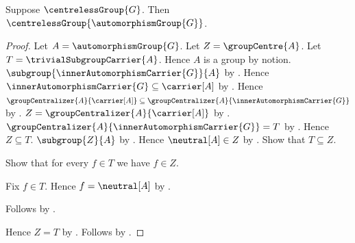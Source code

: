 \begin{theorem}\label{automorphism_group_centreless}
    Suppose $\centrelessGroup{G}$.
    Then $\centrelessGroup{\automorphismGroup{G}}$.
\end{theorem}
\begin{proof}
    Let $A=\automorphismGroup{G}$.
    Let $Z=\groupCentre{A}$.
    Let $T=\trivialSubgroupCarrier{A}$.
    Hence $A$ is a group by notion.
    $\subgroup{\innerAutomorphismCarrier{G}}{A}$ by
        .
    Hence $\innerAutomorphismCarrier{G}\subseteq\carrier[A]$ by
        .
    Hence
        $\groupCentralizer{A}{\carrier[A]}\subseteq
            \groupCentralizer{A}{\innerAutomorphismCarrier{G}}$ by
        .
    $Z=\groupCentralizer{A}{\carrier[A]}$ by
        .
    $\groupCentralizer{A}{\innerAutomorphismCarrier{G}}=T$ by
        .
    Hence $Z\subseteq T$.
    $\subgroup{Z}{A}$ by .
    Hence $\neutral[A]\in Z$ by .
    Show that $T\subseteq Z$.
    \begin{subproof}
        Show that for every $f\in T$ we have $f\in Z$.
        \begin{subproof}
            Fix $f\in T$.
            Hence $f=\neutral[A]$ by
                .
        \end{subproof}
        Follows by .
    \end{subproof}
    Hence $Z=T$ by .
    Follows by .
\end{proof}
